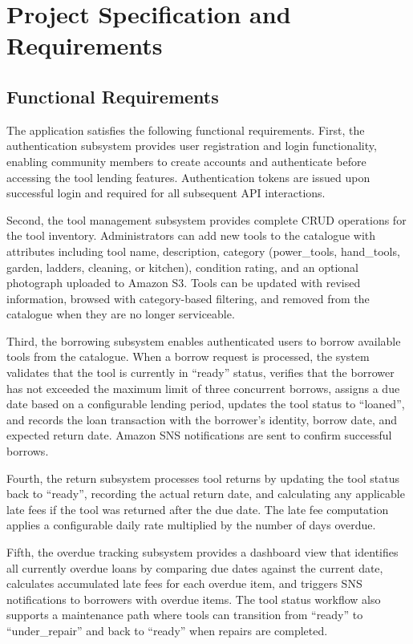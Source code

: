\documentclass[conference]{IEEEtran}
\begin{document}
\section{Project Specification and Requirements}

\subsection{Functional Requirements}

The application satisfies the following functional requirements. First, the authentication subsystem provides user registration and login functionality, enabling community members to create accounts and authenticate before accessing the tool lending features. Authentication tokens are issued upon successful login and required for all subsequent API interactions.

Second, the tool management subsystem provides complete CRUD operations for the tool inventory. Administrators can add new tools to the catalogue with attributes including tool name, description, category (power\_tools, hand\_tools, garden, ladders, cleaning, or kitchen), condition rating, and an optional photograph uploaded to Amazon S3. Tools can be updated with revised information, browsed with category-based filtering, and removed from the catalogue when they are no longer serviceable.

Third, the borrowing subsystem enables authenticated users to borrow available tools from the catalogue. When a borrow request is processed, the system validates that the tool is currently in ``ready'' status, verifies that the borrower has not exceeded the maximum limit of three concurrent borrows, assigns a due date based on a configurable lending period, updates the tool status to ``loaned'', and records the loan transaction with the borrower's identity, borrow date, and expected return date. Amazon SNS notifications are sent to confirm successful borrows.

Fourth, the return subsystem processes tool returns by updating the tool status back to ``ready'', recording the actual return date, and calculating any applicable late fees if the tool was returned after the due date. The late fee computation applies a configurable daily rate multiplied by the number of days overdue.

Fifth, the overdue tracking subsystem provides a dashboard view that identifies all currently overdue loans by comparing due dates against the current date, calculates accumulated late fees for each overdue item, and triggers SNS notifications to borrowers with overdue items. The tool status workflow also supports a maintenance path where tools can transition from ``ready'' to ``under\_repair'' and back to ``ready'' when repairs are completed.
\end{document}
